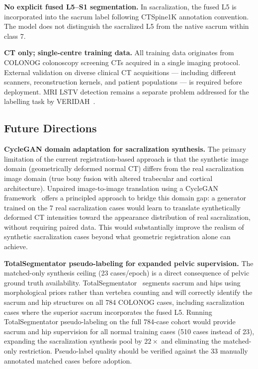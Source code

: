 \documentclass{article}
\begin{document}
\textbf{No explicit fused L5--S1 segmentation.} In sacralization, the fused L5
is incorporated into the sacrum label following CTSpine1K annotation convention.
The model does not distinguish the sacralized L5 from the native sacrum within
class 7.

\textbf{CT only; single-centre training data.} All training data originates
from COLONOG colonoscopy screening CTs acquired in a single imaging protocol.
External validation on diverse clinical CT acquisitions --- including different
scanners, reconstruction kernels, and patient populations --- is required before
deployment. MRI LSTV detection remains a separate problem addressed for the
labelling task by VERIDAH~\citep{moller2026}.

\subsection{Future Directions}
\label{sec:future}

\textbf{CycleGAN domain adaptation for sacralization synthesis.}
The primary limitation of the current registration-based approach is that the
synthetic image domain (geometrically deformed normal CT) differs from the real
sacralization image domain (true bony fusion with altered trabecular and cortical
architecture). Unpaired image-to-image translation using a CycleGAN
framework~\citep{zhu2017cyclegan} offers a principled approach to bridge this
domain gap: a generator trained on the 7 real sacralization cases would learn to
translate synthetically deformed CT intensities toward the appearance distribution
of real sacralization, without requiring paired data. This would substantially
improve the realism of synthetic sacralization cases beyond what geometric
registration alone can achieve.

\textbf{TotalSegmentator pseudo-labeling for expanded pelvic supervision.}
The matched-only synthesis ceiling (23 cases/epoch) is a direct consequence of
pelvic ground truth availability. TotalSegmentator~\citep{wasserthal2023}
segments sacrum and hips using morphological priors rather than vertebra counting
and will correctly identify the sacrum and hip structures on all 784 COLONOG
cases, including sacralization cases where the superior sacrum incorporates the
fused L5. Running TotalSegmentator pseudo-labeling on the full 784-case cohort
would provide sacrum and hip supervision for all normal training cases (510 cases
instead of 23), expanding the sacralization synthesis pool by $22\times$ and
eliminating the matched-only restriction. Pseudo-label quality should be verified
against the 33 manually annotated matched cases before adoption.
\end{document}
